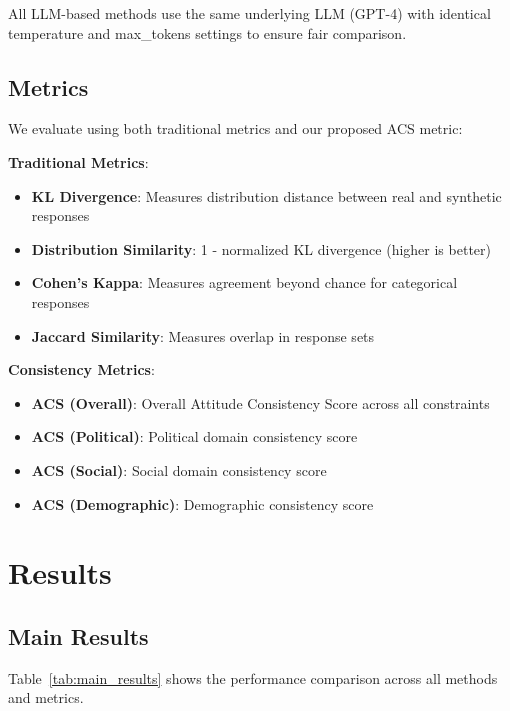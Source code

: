 \documentclass[sigconf, anonymous]{acmart}
\begin{document}
All LLM-based methods use the same underlying LLM (GPT-4) with identical temperature and max_tokens settings to ensure fair comparison.

\subsection{Metrics}

We evaluate using both traditional metrics and our proposed ACS metric:

\textbf{Traditional Metrics}:
\begin{itemize}
    \item \textbf{KL Divergence}: Measures distribution distance between real and synthetic responses
    \item \textbf{Distribution Similarity}: 1 - normalized KL divergence (higher is better)
    \item \textbf{Cohen's Kappa}: Measures agreement beyond chance for categorical responses
    \item \textbf{Jaccard Similarity}: Measures overlap in response sets
\end{itemize}

\textbf{Consistency Metrics}:
\begin{itemize}
    \item \textbf{ACS (Overall)}: Overall Attitude Consistency Score across all constraints
    \item \textbf{ACS (Political)}: Political domain consistency score
    \item \textbf{ACS (Social)}: Social domain consistency score
    \item \textbf{ACS (Demographic)}: Demographic consistency score
\end{itemize}

\section{Results}

\subsection{Main Results}

Table~\ref{tab:main_results} shows the performance comparison across all methods and metrics.
\end{document}
